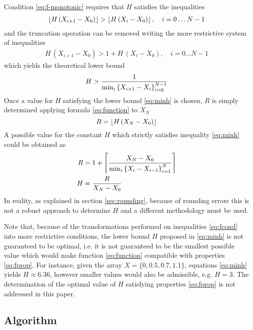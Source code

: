 \documentclass[preprint,1p,times]{elsarticle}
\begin{document}
Condition \eqref{eq:f-monotonic} requires that $H$ satisfies the inequalities
\begin{align}
\label{eq:fcond}
	\left \lfloor H\,(X_{i+1}-X_0) \right \rfloor > \left \lfloor H\,(X_i-X_0) \right \rfloor, \quad  i=0 \dots N-1
\end{align}
and the truncation operation can be removed writing the more restrictive system of inequalities
\begin{align}
\label{eq:fcond9}
	H\,(X_{i+1}-X_0) > 1+ H\,(X_i-X_0), \quad  i=0 \dots N-1
\end{align}
which yields the theoretical lower bound
\begin{equation}
\label{eq:minh}
	H > \frac{1}{\min_i\left \{ X_{i+1}-X_i \right \}_{i=0}^{N-1}}
\end{equation}
Once a value for $H$ satisfying the lower bound \eqref{eq:minh} is chosen, $R$ is simply determined applying formula \eqref{eq:function} to $X_N$
\begin{equation}
\label{eq:minr}
	R = \left \lfloor H\,(X_{N}-X_0) \right \rfloor
\end{equation}
A possible value for the constant $H$ which strictly satisfies inequality \eqref{eq:minh} could be obtained as
\begin{subequations}
\label{eq:rhtheory}
\begin{align}
\label{eq:rtheory}
	R &= 1+\left \lceil  \frac{X_N-X_0}{\min_i\left \{  X_{i}-X_{i-1}  \right \}_{i=1}^{N} }  \right \rceil \\
\label{eq:htheory}
        H &= \frac{R}{X_N-X_0}
\end{align}
\end{subequations}
In reality, as explained in section \ref{sec:rounding}, because of rounding errors this is not a robust approach to determine $H$ and a different methodology must be used.

Note that, because of the transformations performed on inequalities \eqref{eq:fcond} into more restrictive conditions, the lower bound $H$ proposed in \eqref{eq:minh} is not guaranteed to be optimal, i.e. it is not guaranteed to be the smallest possible value which would make function \eqref{eq:function} compatible with properties \eqref{eq:fprop}. For instance, given the array $X=\{0, 0.5, 0.7, 1.1\}$, equations \eqref{eq:minh} yields $H \approx 6.36$, however smaller values would also be admissible, e.g. $H=3$. The determination of the optimal value of $H$ satisfying properties \eqref{eq:fprop} is not addressed in this paper.

\subsection{Algorithm}
\label{sec:dirsearch}
\end{document}
